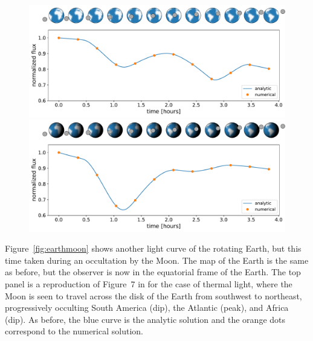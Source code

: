 \documentclass[modern]{aastex62}
\begin{document}
%

\begin{figure}[t!]
    \begin{centering}
        \includegraphics[width=\linewidth]{figures/earthmoon_emitted.pdf}
        \includegraphics[width=\linewidth]{figures/earthmoon.pdf}
    \end{centering}
\end{figure}

Figure~\ref{fig:earthmoon} shows another light curve of the rotating
Earth, but this time taken during an occultation by the Moon. The map
of the Earth is the same as before, but the observer is now in the
equatorial frame of the Earth.
The top panel is a reproduction of
Figure~7 in \citet{Luger2019} for the case of thermal light,
where the Moon is seen to travel across the
disk of the Earth from southwest to northeast, progressively occulting
South America (dip), the Atlantic (peak), and Africa (dip).
As before,
the blue curve is the analytic solution and the orange dots correspond
to the numerical solution.
\end{document}

